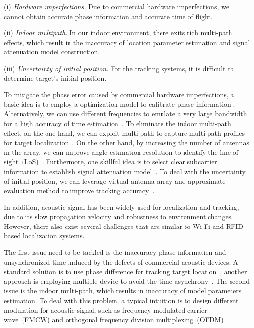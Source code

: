 (i) \emph{Hardware imperfections.} Due to commercial hardware imperfections, we cannot obtain accurate phase information and accurate time of flight.

(ii) \emph{Indoor multipath.} In our indoor environment, there exits rich  multi-path effects, which result in the inaccuracy of location parameter estimation and signal attenuation model construction.

(iii) \emph{Uncertainty of initial position.} For the tracking systems, it is difficult to determine target's initial position.


 To mitigate the phase error caused by commercial hardware imperfections, a basic idea is to employ a optimization model to calibrate phase information \cite{Wang2016D}. Alternatively, we can use different frequencies to emulate a very large bandwidth for a high accuracy of time estimation~\cite{RFind}. To eliminate the indoor multi-path effect, on the one hand, we can exploit multi-path to capture multi-path profiles for target localization~\cite{PinIt}. On the other hand, by increasing the number of antennas in the array, we can improve angle estimation resolution to identify the line-of-sight~(LoS)~\cite{Arraytrack, Spotfi}. Furthermore, one skillful idea is to select clear subcarrier information to establish signal attenuation model~\cite{wang2016lifs}. To deal with the uncertainty of initial position, we can leverage virtual antenna array and approximate evaluation method to improve tracking accuracy~\cite{Tagoram}.

In addition, acoustic signal has been widely used for localization and tracking, due to its slow propagation velocity and robustness to environment changes. However, there also exist several challenges that are similar to Wi-Fi and RFID based localization systems.

The first issue need to be tackled is the inaccuracy phase information and unsynchronized time induced by the defects of commercial acoustic devices. A standard solution is to use phase difference for tracking target location~\cite{LLAP}, another approach is employing multiple device to avoid the time asynchrony~\cite{BeepBeep}.  The second issue is the indoor multi-path, which results in inaccuracy of model parameters estimation. To deal with this problem, a typical intuition is to design different modulation for acoustic signal, such as frequency modulated carrier wave~(FMCW) and orthogonal frequency division multiplexing~(OFDM) \cite{CAT,STRATA}.




